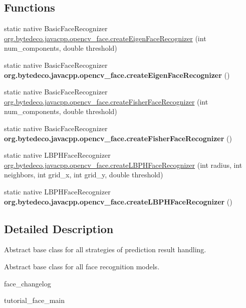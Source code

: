 \subsection*{Functions}
\begin{DoxyCompactItemize}
\item 
static native Basic\+Face\+Recognizer \hyperlink{group__face_ga6f3a56396530d46af3fba9ad04fc80cf}{org.\+bytedeco.\+javacpp.\+opencv\+\_\+face.\+create\+Eigen\+Face\+Recognizer} (int num\+\_\+components, double threshold)
\item 
\mbox{\label{group__face_gac70e2c94b7d6f05d26f762bed96b2da7}} 
static native Basic\+Face\+Recognizer {\bfseries org.\+bytedeco.\+javacpp.\+opencv\+\_\+face.\+create\+Eigen\+Face\+Recognizer} ()
\item 
static native Basic\+Face\+Recognizer \hyperlink{group__face_ga80a98f353dd2ef661444e0d79bbe9daf}{org.\+bytedeco.\+javacpp.\+opencv\+\_\+face.\+create\+Fisher\+Face\+Recognizer} (int num\+\_\+components, double threshold)
\item 
\mbox{\label{group__face_ga241cb766e32721cf0ba5c6fde7006808}} 
static native Basic\+Face\+Recognizer {\bfseries org.\+bytedeco.\+javacpp.\+opencv\+\_\+face.\+create\+Fisher\+Face\+Recognizer} ()
\item 
static native L\+B\+P\+H\+Face\+Recognizer \hyperlink{group__face_ga970c161034e055fb56615aadba87ac4e}{org.\+bytedeco.\+javacpp.\+opencv\+\_\+face.\+create\+L\+B\+P\+H\+Face\+Recognizer} (int radius, int neighbors, int grid\+\_\+x, int grid\+\_\+y, double threshold)
\item 
\mbox{\label{group__face_ga6d5f6361f7aeeb413b5e582ac60ae6e5}} 
static native L\+B\+P\+H\+Face\+Recognizer {\bfseries org.\+bytedeco.\+javacpp.\+opencv\+\_\+face.\+create\+L\+B\+P\+H\+Face\+Recognizer} ()
\end{DoxyCompactItemize}


\subsection{Detailed Description}
Abstract base class for all strategies of prediction result handling. 

Abstract base class for all face recognition models.


\begin{DoxyItemize}
\item face\+\_\+changelog
\item tutorial\+\_\+face\+\_\+main 
\end{DoxyItemize}

